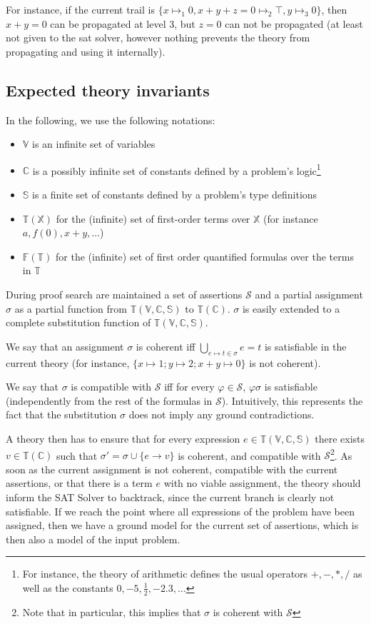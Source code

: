 For instance, if the current trail is $\{x \mapsto_1 0, x + y + z = 0 \mapsto_2 \top, y\mapsto_3 0\}$,
then $x + y = 0$ can be propagated at level $3$, but $z = 0$ can not be propagated (at least not
given to the sat solver, however nothing prevents the theory from propagating and using it internally).

\subsection{Expected theory invariants}

In the following, we use the following notations:
\begin{itemize}
  \item $\mathbb{V}$ is an infinite set of variables
  \item $\mathbb{C}$ is a possibly infinite set of constants defined
    by a problem's logic\footnote{For instance, the theory of arithmetic
    defines the usual operators $+, -, *, /$ as well as the constants
    $0, -5, \frac{1}{2}, -2.3, \ldots$}
  \item $\mathbb{S}$ is a finite set of constants defined by a problem's type definitions
  \item $\mathbb{T}(\mathbb{X})$ for the (infinite) set of first-order terms over $\mathbb{X}$
    (for instance $a, f(0), x + y, \ldots$)
  \item $\mathbb{F}(\mathbb{T})$ for the (infinite) set of first order quantified formulas
    over the terms in $\mathbb{T}$
\end{itemize}

During proof search are maintained a set of assertions $\mathcal{S}$
and a partial assignment $\sigma$ as a partial function from $\mathbb{T}(\mathbb{V, C, S})$
to $\mathbb{T}(\mathbb{C})$. $\sigma$ is easily extended to a complete substitution function of
$\mathbb{T}(\mathbb{V, C, S})$.

We say that an assignment $\sigma$ is coherent iff $\bigcup_{e\mapsto t \in \sigma} e = t$ is satisfiable
in the current theory (for instance, $\{x\mapsto 1; y \mapsto 2; x + y \mapsto 0\}$ is not coherent).

We say that $\sigma$ is compatible with $\mathcal{S}$ iff for every $\varphi \in \mathcal{S}$,
$\varphi\sigma$ is satisfiable (independently from the rest of the formulas in $\mathcal{S}$).
Intuitively, this represents the fact that the substitution $\sigma$ does not imply any
ground contradictions.

A theory then has to ensure that for every expression $e \in \mathbb{T}(\mathbb{V,C,S})$
there exists $v \in \mathbb{T}(\mathbb{C})$ such that $\sigma' = \sigma \cup \{ e \rightarrow v \}$
is coherent, and compatible with $\mathcal{S}$\footnote{Note that in particular, this implies
that $\sigma$ is coherent with $\mathcal{S}$}. As soon as the current assignment is not coherent,
compatible with the current assertions, or that there is a term $e$ with no viable assignment, the theory
should inform the SAT Solver to backtrack, since the current branch is clearly not satisfiable.
If we reach the point where all expressions of the problem have been assigned, then we
have a ground model for the current set of assertions, which is then also a model
of the input problem.

